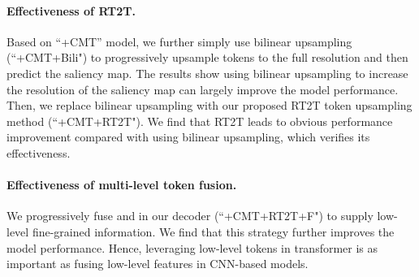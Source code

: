 \documentclass[10pt,twocolumn,letterpaper]{article}
\begin{document}
\paragraph{Effectiveness of RT2T.}
Based on ``+CMT'' model, we further simply use bilinear upsampling (``+CMT+Bili") to progressively upsample tokens to the full resolution and then predict the saliency map.
The results show using bilinear upsampling to increase the resolution of the saliency map can largely improve the model performance.
Then, we replace bilinear upsampling with our proposed RT2T token upsampling method (``+CMT+RT2T"). We find that RT2T leads to obvious performance improvement compared with using bilinear upsampling, which verifies its effectiveness. 

\vspace{-3mm}
\paragraph{Effectiveness of multi-level token fusion.}
We progressively fuse  and  in our decoder (``+CMT+RT2T+F") to supply low-level fine-grained information. We find that this strategy further improves the model performance. Hence, leveraging low-level tokens in transformer is as important as fusing low-level features in CNN-based models.
\end{document}

